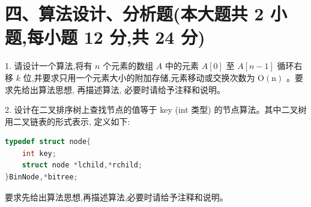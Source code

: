 \section*{四、算法设计、分析题(本大题共 2 小题,每小题 12 分,共 24 分)}

1. 请设计一个算法,将有 \(n\) 个元素的数组 \(A\) 中的元素 \(A\left\lbrack  0\right\rbrack\) 至 \(A\left\lbrack  {n - 1}\right\rbrack\) 循环右移 \(k\) 位,并要求只用一个元素大小的附加存储,元素移动或交换次数为 \(\mathrm{O}\left( \mathrm{n}\right)\) 。要求先给出算法思想, 再描述算法, 必要时请给予注释和说明。
\vspace{15em}

2. 设计在二叉排序树上查找节点的值等于 key (int 类型) 的节点算法。其中二叉树用二叉链表的形式表示, 定义如下:
\begin{lstlisting}[language=C, basicstyle=\ttfamily]
typedef struct node{
    int key;
    struct node *lchild,*rchild;
}BinNode,*bitree;
\end{lstlisting}


要求先给出算法思想,再描述算法,必要时请给予注释和说明。